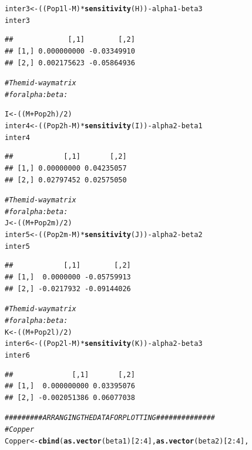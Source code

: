 \documentclass{article}\usepackage[]{graphicx}\usepackage[]{color}
\makeatletter
\newcommand{\hlnum}[1]{\textcolor[rgb]{0.686,0.059,0.569}{#1}}%
\newcommand{\hlcom}[1]{\textcolor[rgb]{0.678,0.584,0.686}{\textit{#1}}}%
\newcommand{\hlopt}[1]{\textcolor[rgb]{0,0,0}{#1}}%
\newcommand{\hlstd}[1]{\textcolor[rgb]{0.345,0.345,0.345}{#1}}%
\newcommand{\hlkwb}[1]{\textcolor[rgb]{0.69,0.353,0.396}{#1}}%
\newcommand{\hlkwd}[1]{\textcolor[rgb]{0.737,0.353,0.396}{\textbf{#1}}}%
\newenvironment{kframe}{%
 \def\at@end@of@kframe{}%
 \ifinner\ifhmode%
  \def\at@end@of@kframe{\end{minipage}}%
  \begin{minipage}{\columnwidth}%
 \fi\fi%
 \def\FrameCommand##1{\hskip\@totalleftmargin \hskip-\fboxsep
 \colorbox{shadecolor}{##1}\hskip-\fboxsep
     \hskip-\linewidth \hskip-\@totalleftmargin \hskip\columnwidth}%
 \MakeFramed {\advance\hsize-\width
   \@totalleftmargin\z@ \linewidth\hsize
   \@setminipage}}%
 {\par\unskip\endMakeFramed%
 \at@end@of@kframe}
\newenvironment{knitrout}{}{} %
\makeatother
\begin{document}
\begin{knitrout}
\begin{kframe}
\begin{alltt}
\hlstd{inter3}\hlkwb{<-}\hlstd{((Pop1l}\hlopt{-}\hlstd{M)}\hlopt{*}\hlkwd{sensitivity}\hlstd{(H))}\hlopt{-}\hlstd{alpha1}\hlopt{-}\hlstd{beta3}
\hlstd{inter3}
\end{alltt}
\begin{verbatim}
##             [,1]        [,2]
## [1,] 0.000000000 -0.03349910
## [2,] 0.002175623 -0.05864936
\end{verbatim}
\begin{alltt}
\hlcom{#The mid-way matrix }
\hlcom{#for alpha:beta:}

\hlstd{I}\hlkwb{<-}\hlstd{((M}\hlopt{+}\hlstd{Pop2h)}\hlopt{/}\hlnum{2}\hlstd{)}
\hlstd{inter4}\hlkwb{<-}\hlstd{((Pop2h}\hlopt{-}\hlstd{M)}\hlopt{*}\hlkwd{sensitivity}\hlstd{(I))}\hlopt{-}\hlstd{alpha2}\hlopt{-}\hlstd{beta1}
\hlstd{inter4}
\end{alltt}
\begin{verbatim}
##            [,1]       [,2]
## [1,] 0.00000000 0.04235057
## [2,] 0.02797452 0.02575050
\end{verbatim}
\begin{alltt}
\hlcom{#The mid-way matrix }
\hlcom{#for alpha:beta:}
\hlstd{J}\hlkwb{<-}\hlstd{((M}\hlopt{+}\hlstd{Pop2m)}\hlopt{/}\hlnum{2}\hlstd{)}
\hlstd{inter5}\hlkwb{<-}\hlstd{((Pop2m}\hlopt{-}\hlstd{M)}\hlopt{*}\hlkwd{sensitivity}\hlstd{(J))}\hlopt{-}\hlstd{alpha2}\hlopt{-}\hlstd{beta2}
\hlstd{inter5}
\end{alltt}
\begin{verbatim}
##            [,1]        [,2]
## [1,]  0.0000000 -0.05759913
## [2,] -0.0217932 -0.09144026
\end{verbatim}
\begin{alltt}
\hlcom{#The mid-way matrix }
\hlcom{#for alpha:beta:}
\hlstd{K}\hlkwb{<-}\hlstd{((M}\hlopt{+}\hlstd{Pop2l)}\hlopt{/}\hlnum{2}\hlstd{)}
\hlstd{inter6}\hlkwb{<-}\hlstd{((Pop2l}\hlopt{-}\hlstd{M)}\hlopt{*}\hlkwd{sensitivity}\hlstd{(K))}\hlopt{-}\hlstd{alpha2}\hlopt{-}\hlstd{beta3}
\hlstd{inter6}
\end{alltt}
\begin{verbatim}
##              [,1]       [,2]
## [1,]  0.000000000 0.03395076
## [2,] -0.002051386 0.06077038
\end{verbatim}
\begin{alltt}
\hlcom{######### ARRANGING THE DATA FOR PLOTTING ##############}
\hlcom{#Copper}
\hlstd{Copper} \hlkwb{<-} \hlkwd{cbind}\hlstd{(}\hlkwd{as.vector}\hlstd{(beta1)[}\hlnum{2}\hlopt{:}\hlnum{4}\hlstd{],} \hlkwd{as.vector}\hlstd{(beta2)[}\hlnum{2}\hlopt{:}\hlnum{4}\hlstd{],}

\end{alltt}
\end{kframe}
\end{knitrout}
\end{document}
